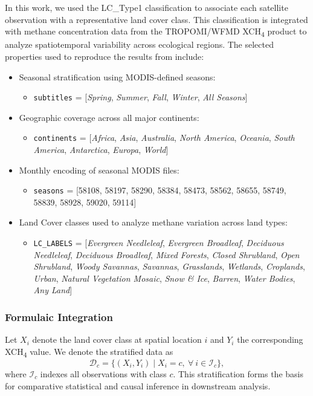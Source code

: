 In this work, we used the LC\_Type1 classification to associate each satellite observation with a representative land cover class. This classification is integrated with methane concentration data from the TROPOMI/WFMD XCH\textsubscript{4} product to analyze spatiotemporal variability across ecological regions. The selected properties used to reproduce the results from \cite{Karoff2023} include:

\begin{itemize}
    \item Seasonal stratification using MODIS-defined seasons:
    \begin{itemize}
        \item \texttt{subtitles} = [\textit{Spring}, \textit{Summer}, \textit{Fall}, \textit{Winter}, \textit{All Seasons}]
    \end{itemize}
    \item Geographic coverage across all major continents:
    \begin{itemize}
        \item \texttt{continents} = [\textit{Africa}, \textit{Asia}, \textit{Australia}, \textit{North America}, \textit{Oceania}, \textit{South America}, \textit{Antarctica}, \textit{Europa}, \textit{World}]
    \end{itemize}
    \item Monthly encoding of seasonal MODIS files:
    \begin{itemize}
        \item \texttt{seasons} = [58108, 58197, 58290, 58384, 58473, 58562, 58655, 58749, 58839, 58928, 59020, 59114]
    \end{itemize}
    \item Land Cover classes used to analyze methane variation across land types:
    \begin{itemize}
        \item \texttt{LC\_LABELS} = [\textit{Evergreen Needleleaf}, \textit{Evergreen Broadleaf}, \textit{Deciduous Needleleaf}, \textit{Deciduous Broadleaf}, \textit{Mixed Forests}, \textit{Closed Shrubland}, \textit{Open Shrubland}, \textit{Woody Savannas}, \textit{Savannas}, \textit{Grasslands}, \textit{Wetlands}, \textit{Croplands}, \textit{Urban}, \textit{Natural Vegetation Mosaic}, \textit{Snow \& Ice}, \textit{Barren}, \textit{Water Bodies}, \textit{Any Land}]
    \end{itemize}
\end{itemize}

\subsubsection{Formulaic Integration}
Let $X_{i}$ denote the land cover class at spatial location $i$ and $Y_{i}$ the corresponding XCH\textsubscript{4} value. We denote the stratified data as
\begin{equation}
\mathcal{D}_c = \{ (X_{i}, Y_{i}) \mid X_{i} = c,\ \forall\ i \in \mathcal{I}_c \},
\end{equation}
where $\mathcal{I}_c$ indexes all observations with class $c$. This stratification forms the basis for comparative statistical and causal inference in downstream analysis.

